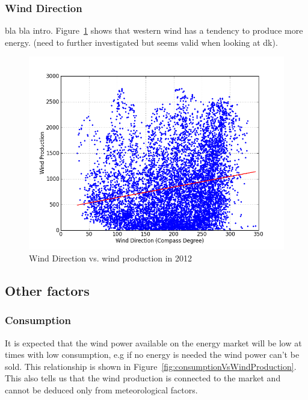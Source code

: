 \subsubsection{Wind Direction}
bla bla intro. Figure~\ref{fig:windDirVsProd} shows that western wind has a tendency to produce more energy. (need to further investigated but seems valid when looking at dk).
\begin{figure}[H]
\centering
\includegraphics[width=0.99\linewidth,natwidth=898,natheight=587]{billeder/productionVsWindDirection.png}
\caption{Wind Direction vs. wind production in 2012}
\label{fig:windDirVsProd}
\end{figure}

\subsection{Other factors}

\subsubsection{Consumption}
It is expected that the wind power available on the energy market will be low at times with low consumption, e.g if no energy is needed the wind power can't be sold.  This relationship is shown in Figure~\ref{fig:consumptionVsWindProduction}. This also tells us that the wind production is connected to the market and cannot be deduced only from meteorological factors.

